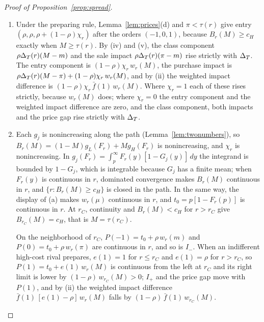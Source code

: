 \begin{proof}[Proof of Proposition~\ref{prop:spread}]
\begin{enumerate}[label=(\roman*),leftmargin=2em]
\begin{enumerate}[label=(\alph*),leftmargin=2em]
\(\int_p^r\bar G_\mu(y)\,dy\), so \(w_r(\mu)\) is differentiable in \(r\), with
\[
\frac{d}{dr}\,w_r(\mu)=-\frac{p^2}{r^2}+\frac{r\int_p^r\bar G_\mu(y)\,dy-\int_p^r(r-y)\bar G_\mu(y)\,dy}{r^2}
=\frac{\int_p^r y\bar G_\mu(y)\,dy-p^2}{r^2}.
\]
Every value of the rival is at least \(p\), so \(\bar G_\mu=1\) below \(p\), and
\(\E_\mu[\min\{\theta,r\}^2]=\int_0^r2y\,\bar G_\mu(y)\,dy=p^2+2\int_p^ry\bar G_\mu(y)\,dy\). This gives the formula. On the path
\(r\ge\underline r\), and every value satisfies \(\theta\ge\underline\theta\), so
\(\min\{\theta,r\}\ge\min\{\underline\theta,\underline r\}>\sqrt3\,p\), and the derivative is positive.
\item Under the preparing rule, Lemma~\ref{lem:prices}(d) and \(\pi<\tau(r)\) give entry
\((\rho,\rho,\rho+(1-\rho)\chi_r)\) after the orders \((-1,0,1)\), because \(B_r(M)\ge c_H\) exactly when
\(M\ge\tau(r)\). By (iv) and (v), the class component \(\rho\Delta_T(r)(M-m)\) and the sale impact \(\rho\Delta_T(r)(\pi-m)\)
rise strictly with \(\Delta_T\). The entry component is \((1-\rho)\chi_r\,w_r(M)\), the purchase impact is
\(\rho\Delta_T(r)(M-\pi)+(1-\rho)\chi_r\,w_r(M)\), and by (ii) the weighted impact difference is
\((1-\rho)\chi_r\,\bar f(1)\,w_r(M)\). Where \(\chi_r=1\) each of these rises strictly, because \(w_r(M)\) does; where
\(\chi_r=0\) the entry component and the weighted impact difference are zero, and the class component, both impacts
and the price gap rise strictly with \(\Delta_T\).
\item Each \(g_j\) is nonincreasing along the path (Lemma~\ref{lem:twonumbers}), so \(B_r(M)=(1-M)g_L(F_r)+Mg_H(F_r)\)
is nonincreasing, and \(\chi_r\) is nonincreasing. In \(g_j(F_r)=\int_p^\infty F_r(y)[1-G_j(y)]\,dy\) the integrand is
bounded by \(1-G_j\), which is integrable because \(G_j\) has a finite mean; when \(F_r(y)\) is continuous in \(r\),
dominated convergence makes \(B_r(M)\) continuous in \(r\), and \(\{r:B_r(M)\ge c_H\}\) is closed in the path. In the
same way, the display of (a) makes \(w_r(\mu)\) continuous in \(r\), and \(t_0=p[1-F_r(p)]\) is continuous in \(r\).
At \(r_C\), continuity and \(B_r(M)<c_H\) for \(r>r_C\) give \(B_{r_C}(M)=c_H\), that is \(M=\tau(r_C)\).

On the neighborhood of \(r_C\), \(P(-1)=t_0+\rho\,w_r(m)\) and \(P(0)=t_0+\rho\,w_r(\pi)\) are continuous in \(r\), and so
is \(I_-\). When an indifferent high-cost rival prepares, \(e(1)=1\) for \(r\le r_C\) and \(e(1)=\rho\) for
\(r>r_C\), so \(P(1)=t_0+e(1)\,w_r(M)\) is continuous from the left at \(r_C\) and its right limit is lower by
\((1-\rho)\,w_{r_C}(M)>0\); \(I_+\) and the price gap move with \(P(1)\), and by (ii) the weighted impact difference
\(\bar f(1)\,[e(1)-\rho]\,w_r(M)\) falls by \((1-\rho)\,\bar f(1)\,w_{r_C}(M)\).


\end{enumerate}
\end{enumerate}
\end{proof}
